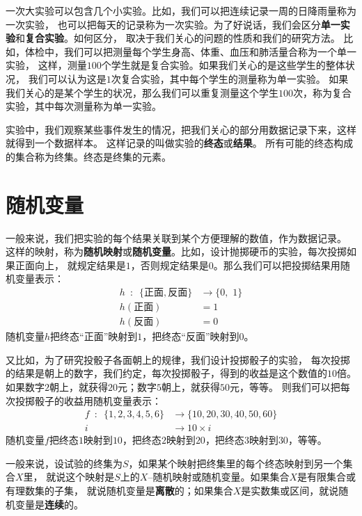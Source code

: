 \documentclass[12pt,UTF8]{ctexbook}
\begin{document}
一次大实验可以包含几个小实验。比如，我们可以把连续记录一周的日降雨量称为一次实验，
也可以把每天的记录称为一次实验。为了好说话，我们会区分\textbf{单一实验}和\textbf{复合实验}。如何区分，
取决于我们关心的问题的性质和我们的研究方法。
比如，体检中，我们可以把测量每个学生身高、体重、血压和肺活量合称为一个单一实验，
这样，测量$100$个学生就是复合实验。如果我们关心的是这些学生的整体状况，
我们可以认为这是$1$次复合实验，其中每个学生的测量称为单一实验。
如果我们关心的是某个学生的状况，那么我们可以重复测量这个学生$100$次，称为复合实验，其中每次测量称为单一实验。

实验中，我们观察某些事件发生的情况，把我们关心的部分用数据记录下来，这样就得到一个数据样本。
这样记录的叫做实验的\textbf{终态}或\textbf{结果}。
所有可能的终态构成的集合称为终集。终态是终集的元素。

\section{随机变量}

一般来说，我们把实验的每个结果关联到某个方便理解的数值，作为数据记录。
这样的映射，称为\textbf{随机映射}或\textbf{随机变量}。比如，设计抛掷硬币的实验，每次投掷如果正面向上，
就规定结果是$1$，否则规定结果是$0$。那么我们可以把投掷结果用随机变量表示：
\begin{align*}
    h \,\,\, : \,\,\, \{\mbox{正面}, \mbox{反面}\} &\rightarrow \{0,\,\, 1\}  \\
    h(\mbox{正面}) &= 1  \\
    h(\mbox{反面}) &= 0  
\end{align*}
随机变量$h$把终态“正面”映射到$1$，把终态“反面”映射到$0$。

又比如，为了研究投骰子各面朝上的规律，我们设计投掷骰子的实验，
每次投掷的结果是朝上的数字，我们约定，每次投掷骰子，得到的收益是这个数值的$10$倍。
如果数字$2$朝上，就获得$20$元；数字$5$朝上，就获得$50$元，等等。
则我们可以把每次投掷骰子的收益用随机变量表示：
\begin{align*}
f \,\,\, : \,\,\, \{1,2,3,4,5,6\} &\rightarrow \{10,20,30,40,50,60\}  \\
 i &\rightarrow 10\times i  
\end{align*}
随机变量$f$把终态$1$映射到$10$，把终态$2$映射到$20$，把终态$3$映射到$30$，等等。

一般来说，设试验的终集为$S$，如果某个映射把终集里的每个终态映射到另一个集合$X$里，
就说这个映射是$S$上的$X$–随机映射或随机变量。如果集合$X$是有限集合或有理数集的子集，
就说随机变量是\textbf{离散}的；如果集合$X$是实数集或区间，就说随机变量是\textbf{连续}的。
\end{document}
